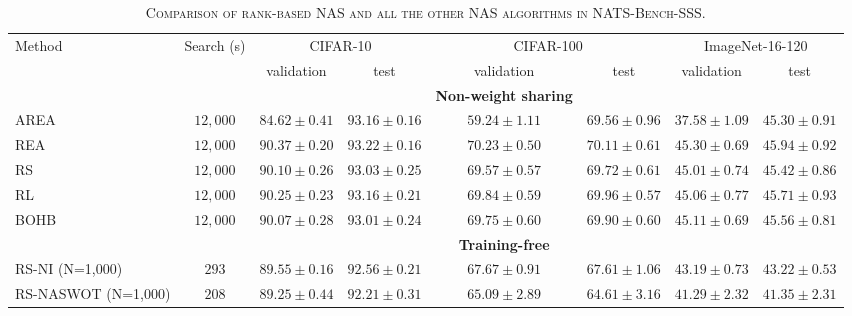 \documentclass[sigconf]{acmart}
\begin{document}
    \begin{table*}[htb]
        \newcommand{\z}{\phantom{0}}
        \caption{\textsc{Comparison of rank-based NAS and all the other NAS algorithms in NATS-Bench-SSS.}}
          \vspace{-\baselineskip}
        \begin{tabular}{@{}lccccccc@{}}\toprule
        Method & Search (s) & \multicolumn{2}{c}{CIFAR-10} & \multicolumn{2}{c}{CIFAR-100} & \multicolumn{2}{c}{ImageNet-16-120} \\ \cmidrule(lr){3-4}\cmidrule(lr){5-6}\cmidrule(lr){7-8}
                            &          & validation       & test             & validation       & test              & validation       & test \\ \midrule
                            &          &                  &                  & \textbf{Non-weight sharing} &        &                  &                  \\
        AREA                & $12,000$ & $84.62 \pm 0.41$ & $93.16 \pm 0.16$ & $59.24 \pm 1.11$ & $69.56 \pm 0.96$  & $37.58 \pm 1.09$ & $45.30 \pm 0.91$ \\
        REA                 & $12,000$ & $90.37 \pm 0.20$ & $93.22 \pm 0.16$ & $70.23 \pm 0.50$ & $70.11 \pm 0.61$  & $45.30 \pm 0.69$ & $45.94 \pm 0.92$ \\
        RS                  & $12,000$ & $90.10 \pm 0.26$ & $93.03 \pm 0.25$ & $69.57 \pm 0.57$ & $69.72 \pm 0.61$  & $45.01 \pm 0.74$ & $45.42 \pm 0.86$ \\
        RL                  & $12,000$ & $90.25 \pm 0.23$ & $93.16 \pm 0.21$ & $69.84 \pm 0.59$ & $69.96 \pm 0.57$  & $45.06 \pm 0.77$ & $45.71 \pm 0.93$ \\
        BOHB                & $12,000$ & $90.07 \pm 0.28$ & $93.01 \pm 0.24$ & $69.75 \pm 0.60$ & $69.90 \pm 0.60$  & $45.11 \pm 0.69$ & $45.56 \pm 0.81$ \\ \midrule
                            &          &                  &                  & \textbf{Training-free} &             &                  &                  \\
        RS-NI (N=1,000)         & $293$& $89.55 \pm 0.16$ & $92.56 \pm 0.21$ & $67.67 \pm 0.91$ & $67.61 \pm 1.06$  & $43.19 \pm 0.73$ & $43.22 \pm 0.53$ \\ 
        RS-NASWOT (N=1,000)     & $208$& $89.25 \pm 0.44$ & $92.21 \pm 0.31$ & $65.09 \pm 2.89$ & $64.61 \pm 3.16$  & $41.29 \pm 2.32$ & $41.35 \pm 2.31$ \\ 

\end{tabular}
\end{table*}
\end{document}
